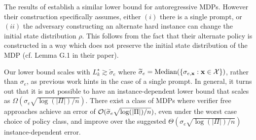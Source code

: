 \begin{remark}
The results of \cite{foster2024behavior} establish a similar lower bound for autoregressive MDPs. However their construction specifically assumes, either $(i)$ there is a single prompt, or $(ii)$ the adversary constructing an alternate hard instance can change the initial state distribution $\rho$. This follows from the fact that their alternate policy is constructed in a way which does not preserve the initial state distribution of the MDP (cf. Lemma G.1 in their paper). 
\end{remark}


Our lower bound scales with $L^\star_k \gtrsim \widetilde{\sigma}_e$ where $\widetilde{\sigma}_e = \text{Median}( \{ \sigma_{e,\mathbf{x}} : \mathbf{x} \in \mathcal{X} \})$, rather than $\sigma_e$, as previous work \cite{foster2024behavior} hints in the case of a single prompt. In general, it turns out that it is not possible to have an instance-dependent lower bound that scales as $\Omega (\sigma_e \sqrt{\log(|\Pi|)/n})$. There exist a class of MDPs where verifier free approaches achieve an error of ${\mathcal{O}} (\widetilde{\sigma}_e \sqrt{\log(|\Pi|)/n})$, even under the worst case choice of policy class, and improve over the suggested $\Theta (\sigma_e \sqrt{\log(|\Pi|)/n})$ instance-dependent error.  


